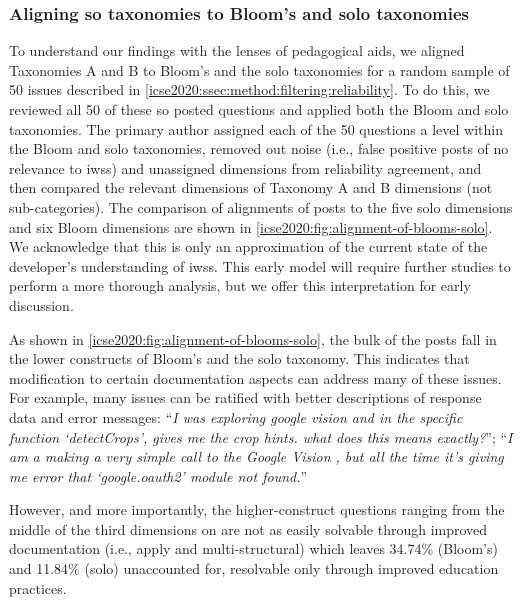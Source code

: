 \subsubsection{Aligning \gls{so} taxonomies to Bloom's and \gls{solo} taxonomies}

To understand our findings with the lenses of pedagogical aids, we aligned Taxonomies A and B to Bloom's and the \gls{solo} taxonomies for a random sample of 50 issues described in \cref{icse2020:ssec:method:filtering:reliability}.  To do this, we reviewed all 50 of these \gls{so} posted questions and applied both the Bloom and \gls{solo} taxonomies. The primary author assigned each of the 50 questions a level within the Bloom and \gls{solo} taxonomies, removed out noise (i.e., false positive posts of no relevance to \glspl{iws}) and unassigned dimensions from reliability agreement, and then compared the relevant dimensions of Taxonomy A and B dimensions (not sub-categories). The comparison of alignments of posts to the five \gls{solo} dimensions and six Bloom dimensions are shown in \cref{icse2020:fig:alignment-of-blooms-solo}.
We acknowledge that this is only an approximation of the current state of the developer's understanding of \glspl{iws}. This early model will require further studies to perform a more thorough analysis, but we offer this interpretation for early discussion. %

As shown in \cref{icse2020:fig:alignment-of-blooms-solo}, the bulk of the posts fall in the lower constructs of Bloom's and the \gls{solo} taxonomy. This indicates that modification to certain documentation aspects can address many of these issues. For example, many issues can be ratified with better descriptions of response data and error messages: ``\textit{I was exploring google vision and in the specific function `detectCrops', gives me the crop hints. what does this means exactly?}''; ``\textit{I am a making a very simple  call to the Google Vision , but all the time it's giving me error that `google.oauth2' module not found.}''

However, and more importantly, the higher-construct questions ranging from the middle of the third dimensions on are not as easily solvable through improved documentation (i.e., apply and multi-structural) which leaves 34.74\% (Bloom's) and 11.84\% (\gls{solo}) unaccounted for, resolvable only through improved education practices. %

